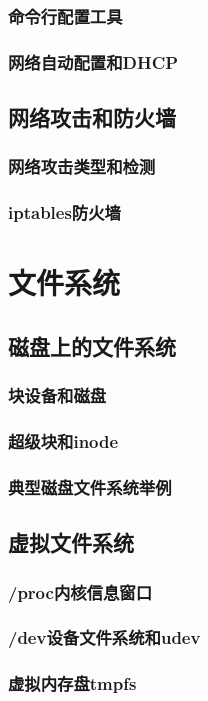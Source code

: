 \documentclass[amstex,twoside]{ctexbook}
\begin{document}
\subsection{ 命令行配置工具}
\subsection{ 网络自动配置和DHCP}
\section{  网络攻击和防火墙	}
\subsection{ 网络攻击类型和检测}
\subsection{  iptables防火墙}

\chapter{文件系统}
\section{  磁盘上的文件系统	}
\subsection{  块设备和磁盘}
\subsection{ 超级块和inode}
\subsection{  典型磁盘文件系统举例}
\section{  虚拟文件系统	}
\subsection{  /proc内核信息窗口}
\subsection{  /dev设备文件系统和udev}
\subsection{  虚拟内存盘tmpfs}
\end{document}
